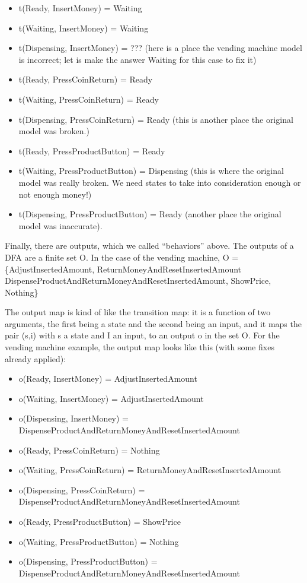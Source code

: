 \begin{itemize}
\tightlist
\item
  t(Ready, InsertMoney) = Waiting
\item
  t(Waiting, InsertMoney) = Waiting
\item
  t(Dispensing, InsertMoney) = ??? (here is a place the vending machine
  model is incorrect; let is make the answer Waiting for this case to
  fix it)
\item
  t(Ready, PressCoinReturn) = Ready
\item
  t(Waiting, PressCoinReturn) = Ready
\item
  t(Dispensing, PressCoinReturn) = Ready (this is another place the
  original model was broken.)
\item
  t(Ready, PressProductButton) = Ready
\item
  t(Waiting, PressProductButton) = Dispensing (this is where the
  original model was really broken. We need states to take into
  consideration enough or not enough money!)
\item
  t(Dispensing, PressProductButton) = Ready (another place the original
  model was inaccurate).
\end{itemize}

Finally, there are outputs, which we called ``behaviors'' above. The
outputs of a DFA are a finite set O. In the case of the vending machine,
O = \{AdjustInsertedAmount, ReturnMoneyAndResetInsertedAmount
DispenseProductAndReturnMoneyAndResetInsertedAmount, ShowPrice,
Nothing\}

The output map is kind of like the transition map: it is a function of
two arguments, the first being a state and the second being an input,
and it maps the pair (s,i) with s a state and I an input, to an output o
in the set O. For the vending machine example, the output map looks like
this (with some fixes already applied):

\begin{itemize}
\tightlist
\item
  o(Ready, InsertMoney) = AdjustInsertedAmount
\item
  o(Waiting, InsertMoney) = AdjustInsertedAmount
\item
  o(Dispensing, InsertMoney) =
  DispenseProductAndReturnMoneyAndResetInsertedAmount
\item
  o(Ready, PressCoinReturn) = Nothing
\item
  o(Waiting, PressCoinReturn) = ReturnMoneyAndResetInsertedAmount
\item
  o(Dispensing, PressCoinReturn) =
  DispenseProductAndReturnMoneyAndResetInsertedAmount
\item
  o(Ready, PressProductButton) = ShowPrice
\item
  o(Waiting, PressProductButton) = Nothing
\item
  o(Dispensing, PressProductButton) =
  DispenseProductAndReturnMoneyAndResetInsertedAmount
\end{itemize}

